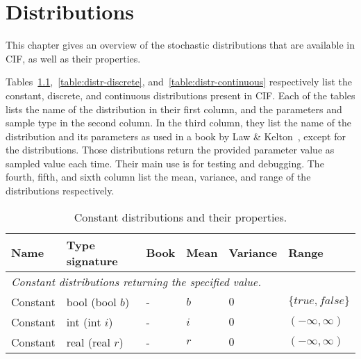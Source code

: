 
\chapter{Distributions}\label{ch:distributions}

This chapter gives an overview of the stochastic distributions that are
available in CIF, as well as their properties.

Tables~\ref{table:distr-constant},~\ref{table:distr-discrete},
and~\ref{table:distr-continuous} respectively list the constant, discrete,
and continuous distributions present in CIF. Each of the tables lists the
name of the distribution in their first column, and the parameters and sample
type in the second column. In the third column, they list the name of the
distribution and its parameters as used in a book by Law \&
Kelton~\cite{LawKelton1991}, except for the
 distributions. Those distributions
return the provided parameter value as sampled value each time. Their main
use is for testing and debugging. The fourth, fifth, and sixth column list
the mean, variance, and range of the distributions respectively.

\begin{table}[b]
  \begin{center}
  \begin{tabular}{|l l l l l l|} \hline
    \textbf{Name} & \textbf{Type signature} & \textbf{Book} & \textbf{Mean} &
        \textbf{Variance} & \textbf{Range} \\

    \hline
    \multicolumn{6}{|l|}{\emph{Constant distributions returning the specified
                               value.}} \\
    Constant &
    bool (bool $b$) &
    - &
    $b$ &
    $0$ &
    $\{true,false\}$ \\[2pt]

    Constant &
    int (int $i$) &
    - &
    $i$ &
    $0$ &
    $(-\infty,\infty)$ \\[2pt]

    Constant &
    real (real $r$) &
    - &
    $r$ &
    $0$ &
    $(-\infty,\infty)$ \\[2pt]

    \hline
  \end{tabular}
  \end{center}
  \caption{Constant distributions and their properties.}
  \label{table:distr-constant}
\end{table}

